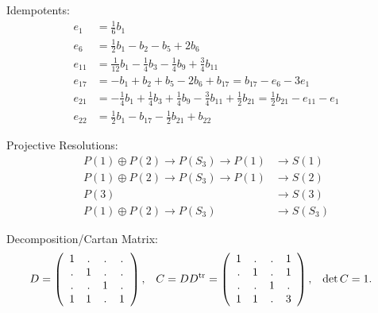 \documentclass[12pt,a4paper]{amsart}
\begin{document}
Idempotents:
\begin{align*}
  e_1 &= \tfrac16 b_1 \\
  e_6 &= \tfrac12 b_1 - b_2 - b_5 + 2 b_6 \\
e_{11} &= \tfrac1{12} b_1 - \tfrac14 b_3 - \tfrac14 b_9 + \tfrac34 b_{11} \\
e_{17} &= -b_1 + b_2 + b_5 - 2 b_6 + b_{17} = b_{17} - e_6 - 3 e_1 \\
e_{21} &= -\tfrac14 b_1 + \tfrac14 b_3 + \tfrac14 b_9 - \tfrac34 b_{11} + \tfrac12 b_{21} = \tfrac12 b_{21} - e_{11} - e_1 \\
e_{22} &= \tfrac12 b_1 - b_{17} - \tfrac12 b_{21} + b_{22}
\end{align*}

Projective Resolutions:
\begin{align*}
P(1) \oplus P(2) \to P(S_3) \to P(1)  & \to S(1) \\
P(1) \oplus P(2) \to P(S_3) \to P(1)  & \to S(2) \\
P(3) & \to S(3) \\
P(1) \oplus P(2) \to P(S_3) & \to S(S_3)
\end{align*}

Decomposition/Cartan Matrix:
\begin{align*}
  D &= \left(
  \begin{array}{cccc}
    1&.&.&.\\
    .&1&.&.\\
    .&.&1&.\\
    1&1&.&1
  \end{array}
  \right)\text,&
C = D D^{\mathrm{tr}} &= \left(
  \begin{array}{cccc}
    1&.&.&1\\
    .&1&.&1\\
    .&.&1&.\\
    1&1&.&3
  \end{array}
  \right)\text,&
\det C &= 1\text.
\end{align*}

\newpage
\scriptsize
\end{document}
